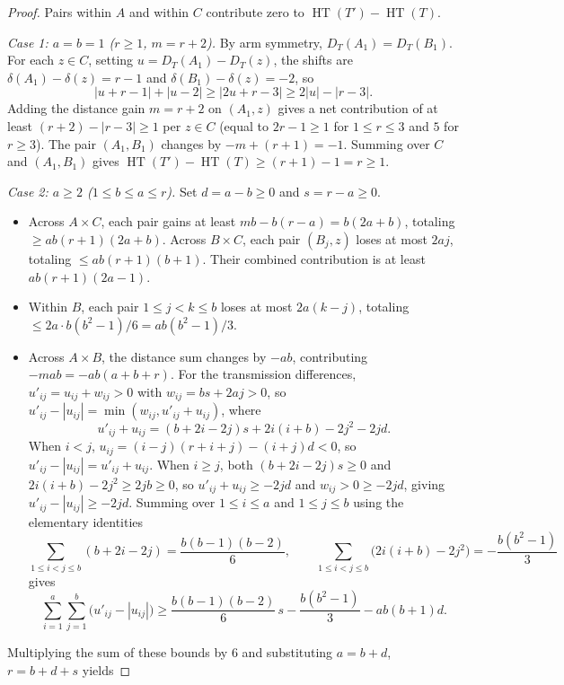 \documentclass[11pt]{article}
\newcommand{\HT}{\operatorname{HT}}
\begin{document}
\begin{proof}
Pairs within $A$ and within $C$ contribute zero to $\HT(T') - \HT(T)$.

\emph{Case 1: $a = b = 1$ ($r \ge 1$, $m = r + 2$).}
By arm symmetry, $D_T(A_1) = D_T(B_1)$. For each $z \in C$, setting $u = D_T(A_1) - D_T(z)$, the shifts are $\delta(A_1) - \delta(z) = r - 1$ and $\delta(B_1) - \delta(z) = -2$, so
\[
  |u + r - 1| + |u - 2| \ge |2u + r - 3| \ge 2|u| - |r - 3|.
\]
Adding the distance gain $m = r + 2$ on $(A_1, z)$ gives a net contribution of at least $(r + 2) - |r - 3| \ge 1$ per $z \in C$ (equal to $2r - 1 \ge 1$ for $1 \le r \le 3$ and $5$ for $r \ge 3$). The pair $(A_1, B_1)$ changes by $-m + (r + 1) = -1$. Summing over $C$ and $(A_1, B_1)$ gives $\HT(T') - \HT(T) \ge (r + 1) - 1 = r \ge 1$.

\emph{Case 2: $a \ge 2$ ($1 \le b \le a \le r$).}
Set $d = a - b \ge 0$ and $s = r - a \ge 0$.
\begin{itemize}
  \item Across $A \times C$, each pair gains at least $mb - b(r - a) = b(2a + b)$, totaling $\ge ab(r + 1)(2a + b)$. Across $B \times C$, each pair $(B_j, z)$ loses at most $2aj$, totaling $\le ab(r + 1)(b + 1)$. Their combined contribution is at least $ab(r + 1)(2a - 1)$.
  \item Within $B$, each pair $1 \le j < k \le b$ loses at most $2a(k - j)$, totaling $\le 2a \cdot b(b^2 - 1)/6 = ab(b^2 - 1)/3$.
  \item Across $A \times B$, the distance sum changes by $-ab$, contributing $-mab = -ab(a + b + r)$. For the transmission differences, $u'_{ij} = u_{ij} + w_{ij} > 0$ with $w_{ij} = bs + 2aj > 0$, so $u'_{ij} - |u_{ij}| = \min(w_{ij}, u'_{ij} + u_{ij})$, where
  \[
    u'_{ij} + u_{ij} = (b + 2i - 2j)s + 2i(i + b) - 2j^2 - 2jd.
  \]
  When $i < j$, $u_{ij} = (i - j)(r + i + j) - (i + j)d < 0$, so $u'_{ij} - |u_{ij}| = u'_{ij} + u_{ij}$. When $i \ge j$, both $(b + 2i - 2j)s \ge 0$ and $2i(i + b) - 2j^2 \ge 2jb \ge 0$, so $u'_{ij} + u_{ij} \ge -2jd$ and $w_{ij} > 0 \ge -2jd$, giving $u'_{ij} - |u_{ij}| \ge -2jd$. Summing over $1 \le i \le a$ and $1 \le j \le b$ using the elementary identities
  \[
    \sum_{1 \le i < j \le b} (b + 2i - 2j) = \frac{b(b - 1)(b - 2)}{6}, \qquad \sum_{1 \le i < j \le b} \bigl(2i(i + b) - 2j^2\bigr) = -\frac{b(b^2 - 1)}{3}
  \]
  gives
  \[
    \sum_{i=1}^a \sum_{j=1}^b \bigl(u'_{ij} - |u_{ij}|\bigr) \ge \frac{b(b - 1)(b - 2)}{6}\, s - \frac{b(b^2 - 1)}{3} - ab(b + 1)d.
  \]
\end{itemize}
Multiplying the sum of these bounds by $6$ and substituting $a = b + d$, $r = b + d + s$ yields

\end{proof}
\end{document}
